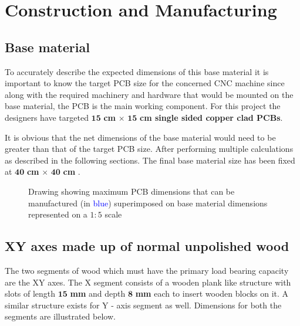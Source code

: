 \chapter{Construction and Manufacturing} \label{chapter3}

\section{Base material} \label{bmaterial}

To accurately describe the expected dimensions of this base material it is important to know the target PCB size for the concerned CNC machine since along with the required machinery and hardware that would be mounted on the base material, the PCB is the main working component. For this project the designers have targeted $\boldsymbol{15}$ \textbf{cm} $\boldsymbol{\times}$ $\boldsymbol{15}$ \textbf{cm single sided copper clad PCBs}. \par

It is obvious that the net dimensions of the base material would need to be greater than that of the target PCB size. After performing multiple calculations as described in the following sections. The final base material size has been fixed at $\boldsymbol{40}$ \textbf{cm} $\boldsymbol{\times}$ $\boldsymbol{40}$ \textbf{cm} .

\begin{figure}[h]
    \centering
    \caption{Drawing showing maximum PCB dimensions that can be manufactured (in \textcolor{blue}{blue}) superimposed on base material dimensions represented on a $1:5$ scale}
    \label{fig:base}
\end{figure}


\section{XY axes made up of normal unpolished wood}

The two segments of wood which must have the primary load bearing capacity are the XY axes. The X segment consists of a wooden plank like structure with slots of length $\boldsymbol{15}$ \textbf{mm} and depth $\boldsymbol{8}$  \textbf{mm} each to insert wooden blocks on it. A similar structure exists for Y - axis segment as well. Dimensions for both the segments are illustrated below. \par 

